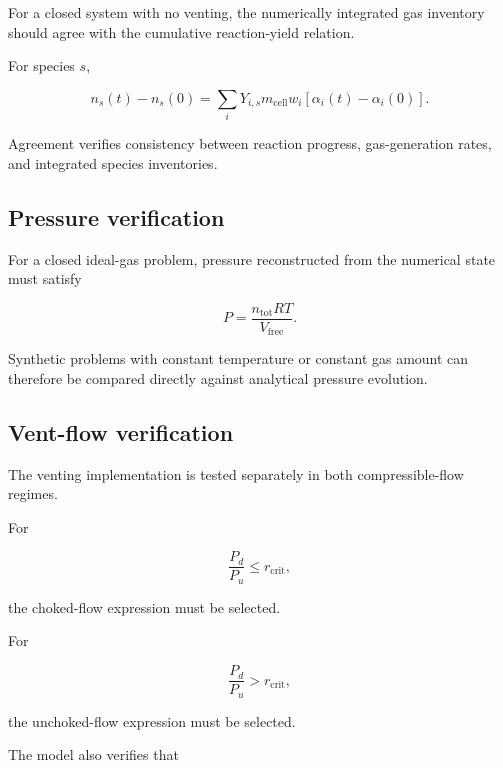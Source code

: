 For a closed system with no venting, the numerically integrated gas
inventory should agree with the cumulative reaction-yield relation.

For species $s$,

\begin{equation}
    n_s(t)
    -
    n_s(0)
    =
    \sum_i
    Y_{i,s}
    m_{\mathrm{cell}}
    w_i
    \left[
        \alpha_i(t)-\alpha_i(0)
    \right].
    \label{eq:verification_gas_conservation}
\end{equation}

Agreement verifies consistency between reaction progress, gas-generation
rates, and integrated species inventories.


\subsection{Pressure verification}

For a closed ideal-gas problem, pressure reconstructed from the numerical
state must satisfy

\begin{equation}
    P
    =
    \frac{
        n_{\mathrm{tot}}RT
    }{
        V_{\mathrm{free}}
    }.
\end{equation}

Synthetic problems with constant temperature or constant gas amount can
therefore be compared directly against analytical pressure evolution.


\subsection{Vent-flow verification}

The venting implementation is tested separately in both compressible-flow
regimes.

For

\begin{equation}
    \frac{P_d}{P_u}
    \leq
    r_{\mathrm{crit}},
\end{equation}

the choked-flow expression must be selected.

For

\begin{equation}
    \frac{P_d}{P_u}
    >
    r_{\mathrm{crit}},
\end{equation}

the unchoked-flow expression must be selected.

The model also verifies that

